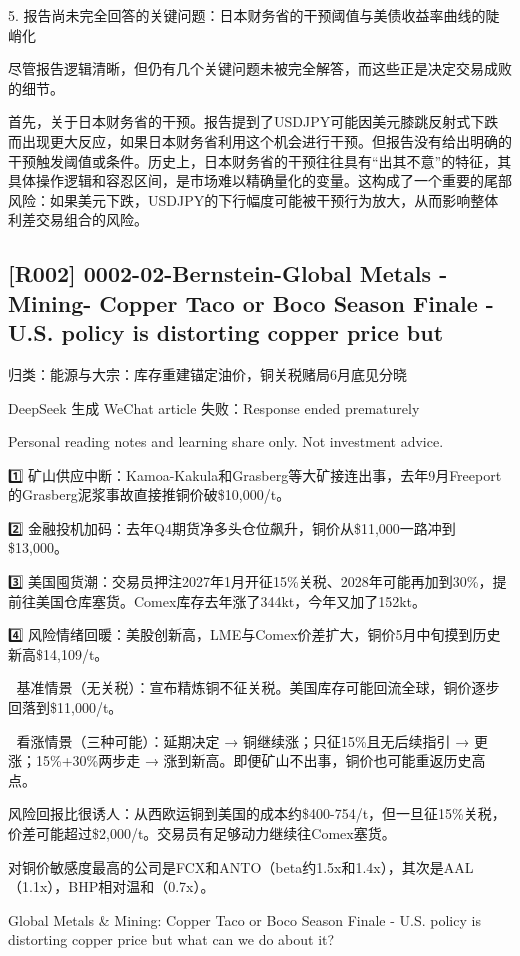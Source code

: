 \documentclass[11pt]{ctexart}
\begin{document}
5. 报告尚未完全回答的关键问题：日本财务省的干预阈值与美债收益率曲线的陡峭化

尽管报告逻辑清晰，但仍有几个关键问题未被完全解答，而这些正是决定交易成败的细节。

首先，关于日本财务省的干预。报告提到了USDJPY可能因美元膝跳反射式下跌而出现更大反应，如果日本财务省利用这个机会进行干预。但报告没有给出明确的干预触发阈值或条件。历史上，日本财务省的干预往往具有“出其不意”的特征，其具体操作逻辑和容忍区间，是市场难以精确量化的变量。这构成了一个重要的尾部风险：如果美元下跌，USDJPY的下行幅度可能被干预行为放大，从而影响整体利差交易组合的风险。

\subsection{[R002] 0002-02-Bernstein-Global Metals - Mining- Copper Taco or Boco Season Finale - U.S. policy is distorting copper price but}
{\small\color{refgray}归类：能源与大宗：库存重建锚定油价，铜关税赌局6月底见分晓}

DeepSeek 生成 WeChat article 失败：Response ended prematurely

Personal reading notes and learning share only. Not investment advice.

1️⃣ 矿山供应中断：Kamoa-Kakula和Grasberg等大矿接连出事，去年9月Freeport的Grasberg泥浆事故直接推铜价破\$10,000/t。

2️⃣ 金融投机加码：去年Q4期货净多头仓位飙升，铜价从\$11,000一路冲到\$13,000。

3️⃣ 美国囤货潮：交易员押注2027年1月开征15\%关税、2028年可能再加到30\%，提前往美国仓库塞货。Comex库存去年涨了344kt，今年又加了152kt。

4️⃣ 风险情绪回暖：美股创新高，LME与Comex价差扩大，铜价5月中旬摸到历史新高\$14,109/t。

📌 基准情景（无关税）：宣布精炼铜不征关税。美国库存可能回流全球，铜价逐步回落到\$11,000/t。

📌 看涨情景（三种可能）：延期决定 → 铜继续涨；只征15\%且无后续指引 → 更涨；15\%+30\%两步走 → 涨到新高。即便矿山不出事，铜价也可能重返历史高点。

风险回报比很诱人：从西欧运铜到美国的成本约\$400-754/t，但一旦征15\%关税，价差可能超过\$2,000/t。交易员有足够动力继续往Comex塞货。

对铜价敏感度最高的公司是FCX和ANTO（beta约1.5x和1.4x），其次是AAL（1.1x），BHP相对温和（0.7x）。

Global Metals \& Mining: Copper Taco or Boco Season Finale - U.S. policy is distorting copper price but what can we do about it?
\end{document}
